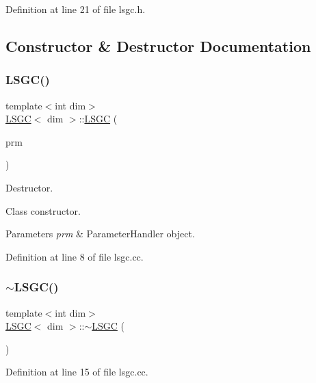 Definition at line 21 of file lsgc.\+h.



\subsection{Constructor \& Destructor Documentation}
\mbox{\label{class_l_s_g_c_a9b89f615563bd3583a4a6a36d7b3eb7d}} 
\subsubsection{\texorpdfstring{L\+S\+G\+C()}{LSGC()}}
{\footnotesize\ttfamily template$<$int dim$>$ \\
\hyperlink{class_l_s_g_c}{L\+S\+GC}$<$ dim $>$\+::\hyperlink{class_l_s_g_c}{L\+S\+GC} (\begin{DoxyParamCaption}\item[{Parameter\+Handler \&}]{prm }\end{DoxyParamCaption})}



Destructor. 

Class constructor.


\begin{DoxyParams}{Parameters}
{\em prm} & Parameter\+Handler object. \\
\hline
\end{DoxyParams}


Definition at line 8 of file lsgc.\+cc.

\mbox{\label{class_l_s_g_c_abcba8afdb075485278288db321776b7e}} 
\subsubsection{\texorpdfstring{$\sim$\+L\+S\+G\+C()}{~LSGC()}}
{\footnotesize\ttfamily template$<$int dim$>$ \\
\hyperlink{class_l_s_g_c}{L\+S\+GC}$<$ dim $>$\+::$\sim$\hyperlink{class_l_s_g_c}{L\+S\+GC} (\begin{DoxyParamCaption}{ }\end{DoxyParamCaption})}



Definition at line 15 of file lsgc.\+cc.



